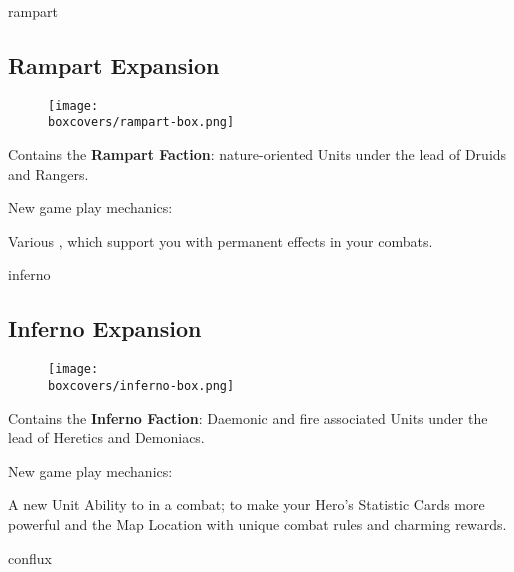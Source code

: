 \begin{multicols}{2}
\columnbreak
\begin{expansion}[title=]{rampart}
    \subsection*{\color{rampart}Rampart Expansion}
    \setlength\intextsep{0pt}
    \setlength\columnsep{0.8em}
    \begin{wrapfigure}{l}{0.35\textwidth}
        \texttt{[image: \\boxcovers/rampart-box.png]}
    \end{wrapfigure}
    Contains the \textbf{Rampart Faction}: nature-oriented Units under the lead of Druids and Rangers.\par
    \medskip
    New game play mechanics:\par
    \smallskip
    Various , which support you with permanent effects in your combats.
\end{expansion}

\vspace*{1em}
\begin{expansion}[title=]{inferno}
    \subsection*{\color{inferno}Inferno Expansion}
    \setlength\intextsep{0pt}
    \setlength\columnsep{0.8em}
    \begin{wrapfigure}{l}{0.35\textwidth}
        \texttt{[image: \\boxcovers/inferno-box.png]}
    \end{wrapfigure}
    Contains the \textbf{Inferno Faction}: Daemonic and fire associated Units under the lead of Heretics and Demoniacs.\par
    \medskip
    New game play mechanics:\par
    \smallskip
    A new Unit Ability to  in a combat;  to make your Hero's Statistic Cards more powerful and the  Map Location with unique combat rules and charming rewards.
\end{expansion}

\vspace*{1em}
\begin{expansion}[title=]{conflux}

\end{expansion}
\end{multicols}
